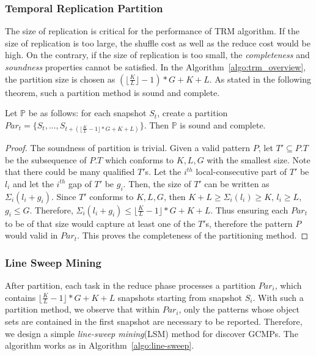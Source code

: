 \subsubsection{Temporal Replication Partition}
The size of replication is critical for the performance of TRM algorithm.
If the size of replication is too large, the shuffle cost as well as the reduce cost would be high. 
On the contrary, if the size of replication is too small, the \emph{completeness} and \emph{soundness}
properties cannot be satisfied. In the Algorithm~\ref{algo:trm_overview}, 
the partition size is chosen as $(\lfloor \frac{K}{L} \rfloor -1)*G+K+L$. As stated in the following
theorem, such a partition method is sound and complete.
\begin{theorem}
\label{thm:replication_partition}
Let $\mathbb{P}$ be as follows: for each snapshot $S_t$, create a partition $Par_t = \{S_t, ...,S_{t+(\lfloor \frac{K}{L}-1\rfloor *G+K + L )}\}$. Then $\mathbb{P}$ is sound and complete.
\end{theorem}
\begin{proof}
The soundness of partition is trivial.
Given a valid pattern $P$, let $T' \subseteq P.T$ be the subsequence of $P.T$ which conforms to $K,L,G$ with the smallest size. Note that there could be many qualified $T'$s.  
Let the $i^{th}$ local-consecutive part of $T'$ be $l_i$ and let the $i^{th}$ gap of $T'$ be $g_i$. Then, the size of $T'$ can be written as $\Sigma_i (l_i + g_i)$. 
Since $T'$ conforms to $K,L,G$, then $K+L \geq \Sigma_i (l_i) \geq K$, $l_i \geq L$, $g_i \leq G$. Therefore, $\Sigma_i(l_i+g_i) \leq \lfloor \frac{K}{L}-1\rfloor *G+K+L$. Thus ensuring each $Par_t$ to be of that size would capture at least one of the $T'$s, therefore the pattern $P$ would valid in $Par_t$. This proves the completeness of the partitioning method.
\end{proof}

\subsubsection{Line Sweep Mining}
After partition, each task in the reduce phase processes a partition $Par_i$, which contains
$\lfloor \frac{K}{L}-1 \rfloor *G+K+L$ snapshots starting from snapshot $S_i$. With such a 
partition method, we observe that within $Par_i$, only the 
patterns whose object sets are contained in the first snapshot are necessary to be reported.
Therefore, we design a simple \emph{line-sweep mining}(LSM) method for discover
GCMPs. The algorithm works as in Algorithm~\ref{algo:line-sweep}.

